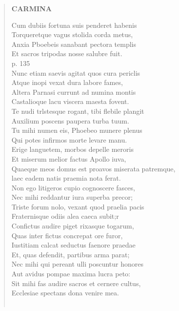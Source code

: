 \documentclass[11pt, a4paper]{report}
\begin{document}
\begin{verse}
    \begin{center} \textbf{CARMINA} \end{center} \marginpar{[210]} Cum dubiis fortuna suis penderet habenis \\ Torqueretque vagus stolida corda metus, \\ Anxia Pboebeis sanabant pectora templis \\ Et sacros tripodas nosse salubre fuit. \\ p. 135 \\ Nunc etiam saevis agitat quos cura periclis \\ Atque inopi vexat dura labore fames, \\ Altera Parnasi currunt ad numina montis \\ Castalioque lacu viscera maesta fovent. \\ Te nudi trlstesque rogant, tibi flebile plangit \\ Auxilium poscens paupera turba tuum. \\ Tu mihi numen eis, Phoebeo munere plenus \\ Qui potes infirmos morte levare manu. \\ Erige languetem, morbos depelle meroris \\ Et miserum melior factus Apollo iuva, \\ Quaeque meos domus est proavos miserata patremque, \\ laec eadem natis praemia nota ferat. \\ Non ego litigeros cupio cognoscere fasces, \\ Nec mihi reddantur iura superba precor; \\ Triste forum nolo, vexant quod praelia pacis \\ Fraternisque odiis alea caeca subit;r \\ Confictus audire piget rixasque togarum, \\ Quas inter fictus concrepat ore furor, \\ Iustitiam calcat seductus faenore praedae \\ Et, quas defendit, partibus arma parat; \\ Nec mihi qui pereant ulli poscuntur honores \\ Aut avidus pompae maxima lucra peto: \\ Sit mihi fas audire sacros et cernere cultus, \\ Ecclesiae spectans dona venire mea. \\ 
        ﻿\pagebreak 

\end{verse}
\end{document}
